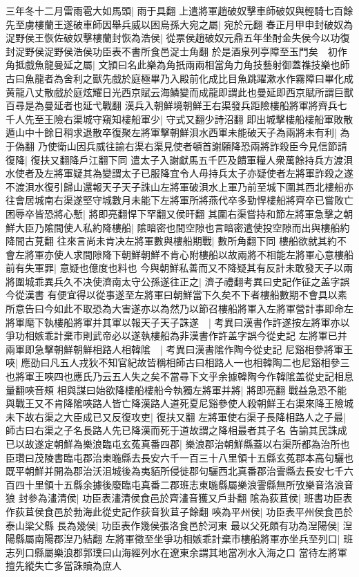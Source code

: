 三年冬十二月雷雨雹大如馬頭|{
	雨于具翻}
上遣將軍趙破奴擊車師破奴與輕騎七百餘先至虜樓蘭王遂破車師因舉兵威以困烏孫大宛之屬|{
	宛於元翻}
春正月甲申封破奴為浞野侯王恢佐破奴擊樓蘭封恢為浩侯|{
	從票侯趙破奴元鼎五年坐酎金失侯今以功復封浞野侯浞野侯浩侯功臣表不書所食邑浞士角翻}
於是酒泉列亭障至玉門矣　初作角抵戲魚龍曼延之屬|{
	文頴曰名此樂為角扺兩兩相當角力角技藝射御蓋襍技樂也師古曰魚龍者為舍利之獸先戲於庭極畢乃入殿前化成比目魚跳躍漱水作霧障曰畢化成黄龍八丈散戲於庭炫耀日光西京賦云海鱗變而成龍即謂此也曼延即西京賦所謂巨獸百尋是為曼延者也延弋戰翻}
漢兵入朝鮮境朝鮮王右渠發兵距險樓船將軍將齊兵七千人先至王險右渠城守窺知樓船軍少|{
	守式又翻少詩沼翻}
即出城擊樓船樓船軍敗散遁山中十餘日稍求退散卒復聚左將軍擊朝鮮浿水西軍未能破天子為兩將未有利|{
	為于偽翻}
乃使衛山因兵威往諭右渠右渠見使者頓首謝願降恐兩將詐殺臣今見信節請復降|{
	復扶又翻降戶江翻下同}
遣太子入謝獻馬五千匹及饋軍糧人衆萬餘持兵方渡浿水使者及左將軍疑其為變謂太子已服降宜令人毋持兵太子亦疑使者左將軍詐殺之遂不渡浿水復引歸山還報天子天子誅山左將軍破浿水上軍乃前至城下圍其西北樓船亦往會居城南右渠遂堅守城數月未能下左將軍所將燕代卒多勁悍樓船將齊卒已嘗敗亡困辱卒皆恐將心慙|{
	將即亮翻悍下罕翻又侯旰翻}
其圍右渠嘗持和節左將軍急擊之朝鮮大臣乃隂間使人私約降樓船|{
	隂暗密也間空隙也言暗密遣使投空隙而出與樓船約降間古莧翻}
往來言尚未肯决左將軍數與樓船期戰|{
	數所角翻下同}
樓船欲就其約不會左將軍亦使人求間隙降下朝鮮朝鮮不肯心附樓船以故兩將不相能左將軍心意樓船前有失軍罪|{
	意疑也億度也料也}
今與朝鮮私善而又不降疑其有反計未敢發天子以兩將圍城乖異兵久不决使濟南太守公孫遂往正之|{
	濟子禮翻考異曰史記作征之盖字誤今從漢書}
有便宜得以從事遂至左將軍曰朝鮮當下久矣不下者樓船數期不會具以素所意告曰今如此不取恐為大害遂亦以為然乃以節召樓船將軍入左將軍營計事即命左將軍麾下執樓船將軍并其軍以報天子天子誅遂　|{
	考異曰漢書作許遂按左將軍亦以爭功相嫉乖計棄市則武帝必以遂執樓船為非漢書作許盖字誤今從史記}
左將軍已并兩軍即急擊朝鮮朝鮮相路人相韓隂　|{
	考異曰漢書隂作陶今從史記}
尼谿相參將軍王唊|{
	應劭曰凡五人戎狄不知官紀故皆稱相師古曰相路人一也相韓陶二也尼谿相參三也將軍王唊四也應氏乃云五人失之矣不當尋下文乎余據韓陶今作韓隂盖從史記相息量翻唊音頰}
相與謀曰始欲降樓船樓船今執獨左將軍并將|{
	將即亮翻}
戰益急恐不能與戰王又不肯降隂唊路人皆亡降漢路人道死夏尼谿參使人殺朝鮮王右渠來降王險城未下故右渠之大臣成已又反復攻吏|{
	復扶又翻}
左將軍使右渠子長降相路人之子最|{
	師古曰右渠之子名長路人先已降漢而死于道故謂之降相最者其子名}
告諭其民誅成已以故遂定朝鮮為樂浪臨屯玄菟真番四郡|{
	樂浪郡治朝鮮縣蓋以右渠所都為治所也臣瓚曰茂陵書臨屯郡治東暆縣去長安六千一百三十八里領十五縣玄菟郡本高句驪也既平朝鮮并開為郡治沃沮城後為夷貊所侵徙郡句驪西北真番郡治霅縣去長安七千六百四十里領十五縣余據後廢臨屯真番二郡班志東暆縣屬樂浪霅縣無所攷樂音洛浪音狼}
封參為澅清侯|{
	功臣表澅清侯食邑於齊澅音獲又戶卦翻}
隂為荻苴侯|{
	班書功臣表作荻苴侯食邑於勃海此從史記作荻音狄苴子餘翻}
唊為平州侯|{
	功臣表平州侯食邑於泰山梁父縣}
長為幾侯|{
	功臣表作幾侯張洛食邑於河東}
最以父死頗有功為湼陽侯|{
	湼陽縣屬南陽郡湼乃結翻}
左將軍徵至坐爭功相嫉乖計棄市樓船將軍亦坐兵至列口|{
	班志列口縣屬樂浪郡郭璞曰山海經列水在遼東余謂其地當冽水入海之口}
當待左將軍擅先縱失亡多當誅贖為庶人


